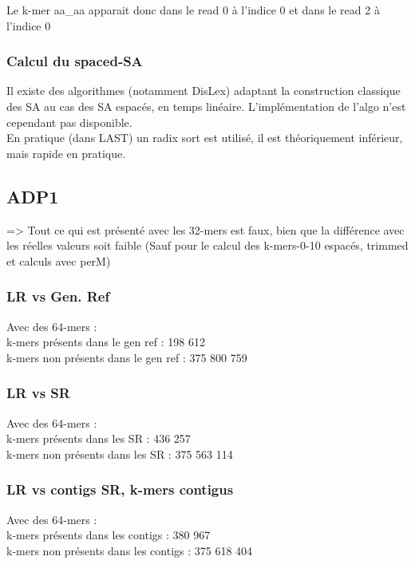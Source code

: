 \documentclass[12pt]{article}
\begin{document}
Le k-mer aa\_aa apparait donc dans le read 0 à l'indice 0 et dans le read 2 à l'indice 0

\subsubsection{Calcul du spaced-SA}

Il existe des algorithmes (notamment DisLex) adaptant la construction classique des SA au cas des SA espacés, en temps linéaire. L'implémentation de l'algo n'est cependant pas disponible. \\
En pratique (dans LAST) un radix sort est utilisé, il est théoriquement inférieur, mais rapide en pratique. 

\subsection{ADP1}

=> Tout ce qui est présenté avec les 32-mers est faux, bien que la différence avec les réelles valeurs soit faible
(Sauf pour le calcul des k-mers-0-10 espacés, trimmed et calculs avec perM)

\subsubsection{LR vs Gen. Ref}

Avec des 64-mers : \\

k-mers présents dans le gen ref : 198 612 \\
k-mers non présents dans le gen ref : 375 800 759

\subsubsection{LR vs SR}

Avec des 64-mers : \\

k-mers présents dans les SR : 436 257 \\
k-mers non présents dans les SR : 375 563 114

\subsubsection{LR vs contigs SR, k-mers contigus}

Avec des 64-mers : \\

k-mers présents dans les contigs : 380 967 \\
k-mers non présents dans les contigs : 375 618 404 \\
\end{document}
